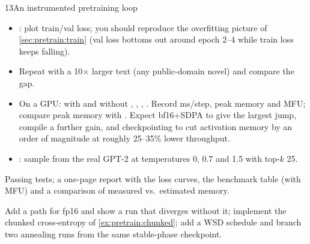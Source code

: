 \begin{labbox}{13}{An instrumented pretraining loop}
\begin{itemize}
\item {}: plot train/val loss;
  you should reproduce the overfitting picture of \cref{sec:pretrain:train} (val loss bottoms
  out around epoch 2--4 while train loss keeps falling).
\item Repeat with a 10$\times$ larger text (any public-domain novel) and compare the gap.
\item On a GPU:  with and without
  , , , . Record ms/step, peak
  memory and MFU; compare peak memory with . Expect bf16+SDPA
  to give the largest jump, compile a further gain, and checkpointing to cut activation memory
  by an order of magnitude at roughly 25--35\% lower throughput.
\item {}: sample from the real GPT-2 at temperatures
  0, 0.7 and 1.5 with top-$k$ 25.
\end{itemize}

Passing tests; a one-page report with the loss curves, the benchmark table (with MFU) and a
comparison of measured vs.\ estimated memory.

Add a  path for fp16 and show a run that diverges without it; implement the
chunked cross-entropy of \cref{ex:pretrain:chunked}; add a WSD schedule and
branch two annealing runs from the same stable-phase checkpoint.
\end{labbox}
